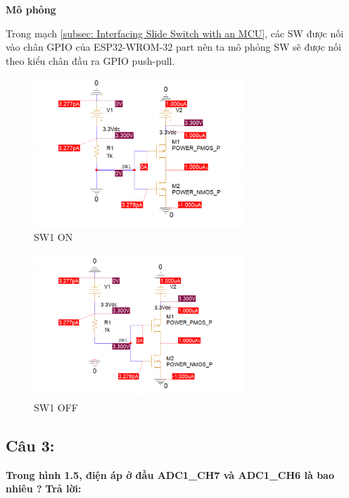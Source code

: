 \textbf{Mô phỏng}

Trong mạch \ref{subsec: Interfacing Slide Switch with an MCU}, các SW được nối vào chân GPIO của ESP32-WROM-32 part nên ta mô phỏng SW sẽ được nối theo kiểu chân đầu ra GPIO push-pull.

\begin{figure}[ht]
    \centering
    \includegraphics[width=0.7\textwidth]{graphics/section5/f1.png}
    \caption{SW1 ON}
\end{figure}

\begin{figure}[ht]
    \centering
    \includegraphics[width=0.7\textwidth]{graphics/section5/f2.png}
    \caption{SW1 OFF}
\end{figure}

\pagebreak
\subsection{Câu 3:}
\textbf{Trong hình 1.5, điện áp ở đầu ADC1\_CH7 và ADC1\_CH6 là bao nhiêu ?}
\textbf{Trả lời:}

